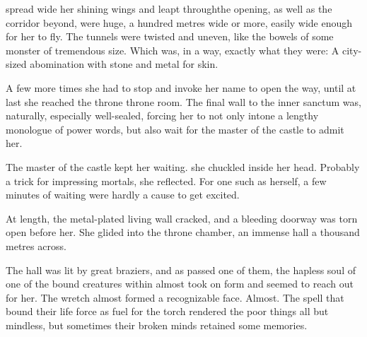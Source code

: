 \Nzessua{} spread wide her shining wings and leapt through\dash the opening, as well as the corridor beyond, were huge, a hundred metres wide or more, easily wide enough for her to fly. The tunnels were twisted and uneven, like the bowels of some monster of tremendous size. Which was, in a way, exactly what they were: A city-sized abomination with stone and metal for skin. 



A few more times she had to stop and invoke her name to open the way, until at last she reached the throne throne room.
The final wall to the inner sanctum was, naturally, especially well-sealed, forcing her to not only intone a lengthy monologue of power words, but also wait for the master of the castle to admit her. 

The master of the castle kept her waiting.  she chuckled inside her head. Probably a trick for impressing mortals, she reflected. For one such as herself, a few minutes of waiting %
were hardly a cause to get excited.

At length, the metal-plated living wall cracked, and a bleeding doorway was torn open before her. 
She glided into the throne chamber, an immense hall a thousand metres across. 

The hall was lit by great braziers, and as \Nzessua{} passed one of them, the hapless soul of one of the bound creatures within almost took on form and seemed to reach out for her. 
The wretch almost formed a recognizable face. Almost. The spell that bound their life force as fuel for the torch rendered the poor things all but mindless, but sometimes their broken minds retained some memories. 

